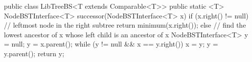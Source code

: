 public class LibTreeBS<T extends Comparable<T>> {
	public static <T> NodeBSTInterface<T> successor(NodeBSTInterface<T> x) {
		if (x.right() != null) {
			// leftmost node in the right subtree
			return minimum(x.right());
		} else {
			// find the lowest ancestor of x whose left child is an ancestor of x
			NodeBSTInterface<T> y = null;
			y = x.parent();
			while (y != null && x == y.right()) {
				x = y;
				y = y.parent();
			}
			return y;
		}
	}
}